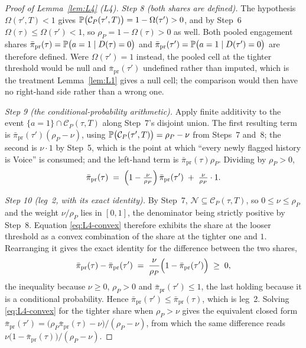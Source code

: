 \begin{proof}[Proof of Lemma~\ref{lem:L4} (L4)]
\emph{Step 8 (both shares are defined).} The hypothesis $\Omega(\tau',T) < 1$ gives
$\mathbb{P}\bigl(\mathcal C_P(\tau',T)\bigr) = 1-\Omega(\tau') > 0$, and by Step~6
$\Omega(\tau) \le \Omega(\tau') < 1$, so $\rho_P = 1-\Omega(\tau) > 0$ as well. Both pooled
engagement shares $\bar\pi_{\mathrm{pr}}(\tau) = \mathbb{P}\bigl(a=1 \mid D(\tau)=0\bigr)$ and
$\bar\pi_{\mathrm{pr}}(\tau') = \mathbb{P}\bigl(a=1 \mid D(\tau')=0\bigr)$ are therefore defined. Were
$\Omega(\tau') = 1$ instead, the pooled cell at the tighter threshold would be null and
$\bar\pi_{\mathrm{pr}}(\tau')$ undefined rather than imputed, which is the treatment
Lemma~\ref{lem:L1} gives a null cell; the comparison would then have no right-hand side rather than a
wrong one.

\emph{Step 9 (the conditional-probability arithmetic).} Apply finite additivity to the event
$\{a=1\}\cap\mathcal C_P(\tau,T)$ along Step~7's disjoint union. The first resulting term is
$\bar\pi_{\mathrm{pr}}(\tau')(\rho_P-\nu)$, using
$\mathbb{P}\bigl(\mathcal C_P(\tau',T)\bigr) = \rho_P-\nu$ from Steps~7 and~8; the second is $\nu\cdot 1$
by Step~5, which is the point at which ``every newly flagged history is Voice'' is consumed; and the
left-hand term is $\bar\pi_{\mathrm{pr}}(\tau)\rho_P$. Dividing by $\rho_P > 0$,
\begin{equation}
\label{eq:L4-convex}
\bar\pi_{\mathrm{pr}}(\tau) \;=\; \Bigl(1-\tfrac{\nu}{\rho_P}\Bigr)\,\bar\pi_{\mathrm{pr}}(\tau')
 \;+\; \tfrac{\nu}{\rho_P}\cdot 1 .
\end{equation}

\emph{Step 10 (leg~2, with its exact identity).} By Step~7, $\mathcal N \subseteq \mathcal
C_P(\tau,T)$, so $0 \le \nu \le \rho_P$ and the weight $\nu/\rho_P$ lies in $[0,1]$, the denominator
being strictly positive by Step~8. Equation \eqref{eq:L4-convex} therefore exhibits the share at the
looser threshold as a convex combination of the share at the tighter one and $1$. Rearranging it
gives the exact identity for the difference between the two shares,
\begin{equation}
\label{eq:L4-share}
\bar\pi_{\mathrm{pr}}(\tau) - \bar\pi_{\mathrm{pr}}(\tau')
 \;=\; \frac{\nu}{\rho_P}\Bigl(1-\bar\pi_{\mathrm{pr}}(\tau')\Bigr) \;\ge\; 0,
\end{equation}
the inequality because $\nu \ge 0$, $\rho_P > 0$ and $\bar\pi_{\mathrm{pr}}(\tau') \le 1$, the last
holding because it is a conditional probability. Hence
$\bar\pi_{\mathrm{pr}}(\tau') \le \bar\pi_{\mathrm{pr}}(\tau)$, which is leg~2. Solving
\eqref{eq:L4-convex} for the tighter share when $\rho_P > \nu$ gives the equivalent closed form
$\bar\pi_{\mathrm{pr}}(\tau') = \bigl(\rho_P\bar\pi_{\mathrm{pr}}(\tau)-\nu\bigr)/(\rho_P-\nu)$,
from which the same difference reads $\nu\bigl(1-\bar\pi_{\mathrm{pr}}(\tau)\bigr)/(\rho_P-\nu)$.


\end{proof}
